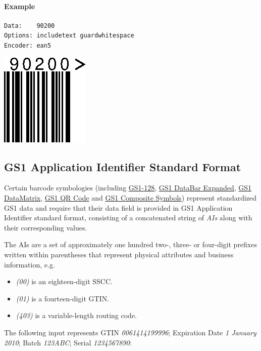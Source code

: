 \hypertarget{example-24}{%
\paragraph{Example}\label{example-24}}

\begin{verbatim}
Data:    90200
Options: includetext guardwhitespace
Encoder: ean5
\end{verbatim}

\includegraphics{images/ean5-1.eps}

\hypertarget{gs1-application-identifier-standard-format}{%
\subsection{GS1 Application Identifier Standard
Format}\label{gs1-application-identifier-standard-format}}

Certain barcode symbologies (including
\protect\hyperlink{gs1-128}{GS1-128},
\protect\hyperlink{gs1-databar-expanded}{GS1 DataBar Expanded},
\protect\hyperlink{gs1-datamatrix}{GS1 DataMatrix},
\protect\hyperlink{gs1-qr-code}{GS1 QR Code} and
\protect\hyperlink{gs1-composite-symbols}{GS1 Composite Symbols})
represent standardized GS1 data and require that their data field is
provided in GS1 Application Identifier standard format, consisting of a
concatenated string of \emph{AIs} along with their corresponding values.

The AIs are a set of approximately one hundred two-, three- or
four-digit prefixes written within parentheses that represent physical
attributes and business information, e.g.

\begin{itemize}
\tightlist
\item
  \emph{(00)} is an eighteen-digit SSCC.
\item
  \emph{(01)} is a fourteen-digit GTIN.
\item
  \emph{(403)} is a variable-length routing code.
\end{itemize}

The following input represents GTIN \emph{0061414199996}; Expiration
Date \emph{1 January 2010}; Batch \emph{123ABC}; Serial
\emph{1234567890}:

